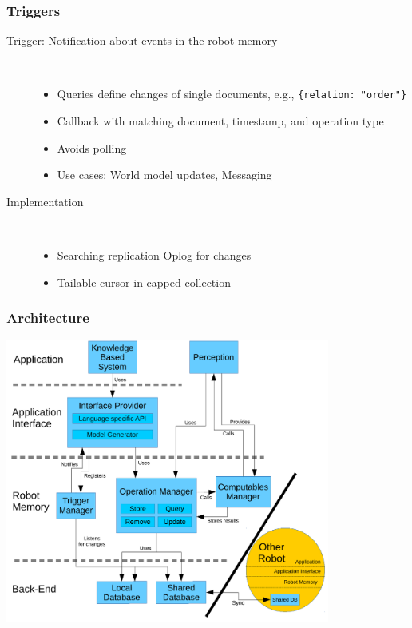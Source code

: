\begin{frame}
  \frametitle{Triggers}
  \begin{description}
  \item[Trigger: Notification about events in the robot memory]%
                \hfill \\
    \begin{itemize}
    \item Queries define changes of single documents, e.g., \texttt{\{relation: "order"\}}
    \item Callback with matching document, timestamp, and operation type
    \item Avoids polling
    \item Use cases: World model updates, Messaging %
    \end{itemize}
  \item[Implementation]%
                \hfill \\
    \begin{itemize}
    \item Searching replication Oplog for changes
    \item Tailable cursor in capped collection %
    \end{itemize}
  \end{description}
\end{frame}

\begin{frame}
  \frametitle{Architecture}
  \center
  \includegraphics[width=0.8\textwidth]{../thesis/architecture.pdf}
\end{frame}

